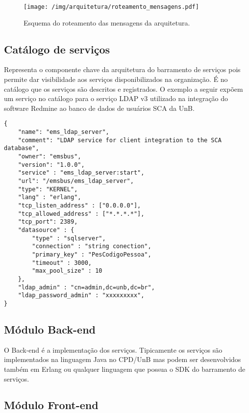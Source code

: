 \begin{figure}[htb]
\centering
\texttt{[image: /img/arquitetura/roteamento\_mensagens.pdf]}
\caption{Esquema do roteamento das mensagens da arquitetura.}
\label{fig:roteamento_mensagens}
\end{figure}
\FloatBarrier


\subsection{Catálogo de serviços}

Representa o componente chave da arquitetura do barramento de serviços pois permite
dar visibilidade aos serviços disponibilizados na organização. É no catálogo que 
os serviços são descritos e registrados. O exemplo a seguir expõem um serviço no catálogo 
para o serviço LDAP v3 utilizado na integração do software Redmine 
ao banco de dados de usuários SCA da UnB.


\renewcommand{\lstlistingname}{Código}             
\begin{lstlisting}[caption=Exemplo de um serviço no catálogo de serviços., label=fig:catalogo_processo] 
{
	"name": "ems_ldap_server",
	"comment": "LDAP service for client integration to the SCA database",
	"owner": "emsbus",
	"version": "1.0.0",
	"service" : "ems_ldap_server:start",
	"url": "/emsbus/ems_ldap_server",
	"type": "KERNEL",
	"lang" : "erlang",
	"tcp_listen_address" : ["0.0.0.0"],
	"tcp_allowed_address" : ["*.*.*.*"],
	"tcp_port": 2389,
	"datasource" : {
		"type" : "sqlserver",
		"connection" : "string conection",
		"primary_key" : "PesCodigoPessoa",
		"timeout" : 3000,
		"max_pool_size" : 10
	},	
	"ldap_admin" : "cn=admin,dc=unb,dc=br",
	"ldap_password_admin" : "xxxxxxxxx",
}
\end{lstlisting}


\subsection{Módulo Back-end}

O Back-end é a implementação dos serviços. Tipicamente
os serviços são implementados na linguagem Java no CPD/UnB
mas podem ser desenvolvidos também em Erlang ou qualquer linguagem que possua 
o SDK do barramento de serviços. 


\subsection{Módulo Front-end}

